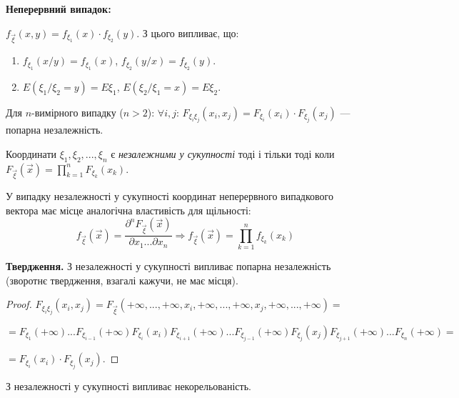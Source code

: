 \noindent\textbf{Неперервний випадок: }

$f_{\vec{\xi}}(x, y) = f_{\xi_1}(x)\cdot f_{\xi_2}(y)$.
З цього випливає, що:

\begin{enumerate}
    \item $f_{\xi_1}(x/y) = f_{\xi_1}(x)$,    
    $f_{\xi_2}(y/x) = f_{\xi_2}(y)$.
    \item $E(\xi_1 / \xi_2 = y) = E\xi_1$, 
    $E(\xi_2 / \xi_1 = x) = E\xi_2$.
\end{enumerate}

\noindent Для $n$-вимірного випадку ($n > 2$):
$\forall i,j$: $F_{\xi_i\xi_j}(x_i, x_j) = F_{\xi_i}(x_i)\cdot F_{\xi_j}(x_j)$ --- 
попарна незалежність.

\begin{definition}
    Координати $\xi_1, \xi_2, ..., \xi_n$ є \emph{незалежними у сукупності} 
    тоді і тільки тоді коли $F_{\vec{\xi}}(\vec{x}) = 
    \prod\limits_{k=1}^n F_{\xi_k}(x_k)$.
\end{definition}
У випадку незалежності у сукупності координат неперервного випадкового вектора має місце аналогічна
властивість для щільності:
\begin{equation*}
    f_{\vec{\xi}}(\vec{x}) = \frac{\partial^nF_{\vec{\xi}}(\vec{x})}
    {\partial x_1...\partial x_n} \Rightarrow 
    f_{\vec{\xi}}(\vec{x}) = \prod\limits_{k=1}^n f_{\xi_k}(x_k)
\end{equation*}

\noindent\textbf{Твердження.}
    З незалежності у сукупності випливає попарна незалежність
    (зворотнє твердження, взагалі кажучи, не має місця).
\begin{proof}
    $F_{\xi_i\xi_j}(x_i, x_j) = F_{\vec{\xi}}(+\infty, ..., +\infty, x_i, 
    +\infty, ..., +\infty, x_j, +\infty, ..., +\infty) = $

    $= F_{\xi_1}(+\infty)...F_{\xi_{i-1}}(+\infty)F_{\xi_i}(x_i)
    F_{\xi_{i+1}}(+\infty)...F_{\xi_{j-1}}(+\infty)F_{\xi_{j}}(x_j)
    F_{\xi_{j+1}}(+\infty)...F_{\xi_n}(+\infty) = $
    
    $= F_{\xi_i}(x_i)\cdot F_{\xi_j}(x_j)$.
\end{proof}

\begin{remark}
    З незалежності у сукупності випливає некорельованість.
\end{remark}